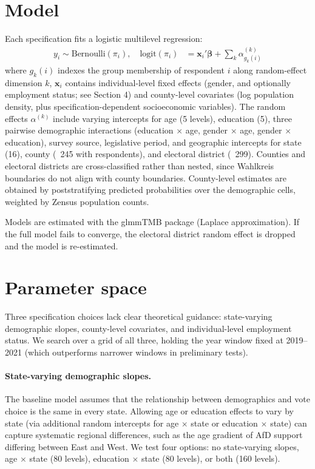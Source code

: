 \documentclass[11pt]{article}
\begin{document}
\section{Model}

Each specification fits a logistic multilevel regression:
%
\begin{align*}
y_i \sim \text{Bernoulli}(\pi_i), \quad \text{logit}(\pi_i) &= \mathbf{x}_i'\boldsymbol{\beta} + \sum_k \alpha^{(k)}_{g_k(i)}
\end{align*}
%
where $g_k(i)$ indexes the group membership of respondent $i$ along random-effect dimension $k$, $\mathbf{x}_i$ contains individual-level fixed effects (gender, and optionally employment status; see Section 4) and county-level covariates (log population density, plus specification-dependent socioeconomic variables). The random effects $\alpha^{(k)}$ include varying intercepts for age (5 levels), education (5), three pairwise demographic interactions (education $\times$ age, gender $\times$ age, gender $\times$ education), survey source, legislative period, and geographic intercepts for state (16), county (~245 with respondents), and electoral district (~299). Counties and electoral districts are cross-classified rather than nested, since Wahlkreis boundaries do not align with county boundaries. County-level estimates are obtained by poststratifying predicted probabilities over the demographic cells, weighted by Zensus population counts.

Models are estimated with the glmmTMB package (Laplace approximation). If the full model fails to converge, the electoral district random effect is dropped and the model is re-estimated.

\section{Parameter space}

Three specification choices lack clear theoretical guidance: state-varying demographic slopes, county-level covariates, and individual-level employment status. We search over a grid of all three, holding the year window fixed at 2019--2021 (which outperforms narrower windows in preliminary tests).

\paragraph{State-varying demographic slopes.} The baseline model assumes that the relationship between demographics and vote choice is the same in every state. Allowing age or education effects to vary by state (via additional random intercepts for age $\times$ state or education $\times$ state) can capture systematic regional differences, such as the age gradient of AfD support differing between East and West. We test four options: no state-varying slopes, age $\times$ state (80 levels), education $\times$ state (80 levels), or both (160 levels).
\end{document}
